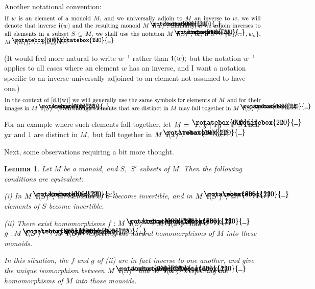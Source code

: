 \documentclass{amsart}
\newtheorem{lemma}[equation]{Lemma}
\numberwithin{equation}{section}
\newcommand{\I}{\mathbf{i}\hspace{.05em}}
\newcommand{\langl}{\begin{picture}(.51em,1em)
\put(.11em,.33em){\rotatebox{60}{\line(1,0){.55em}}}
\put(.11em,.33em){\rotatebox{300}{\line(1,0){.55em}}}
\end{picture}}
\newcommand{\rangl}{\begin{picture}(.5em,1em)
\put(.09em,.33em){\rotatebox{120}{\line(1,0){.55em}}}
\put(.09em,.33em){\rotatebox{240}{\line(1,0){.55em}}}
\end{picture}}
\begin{document}
Another notational convention:\vspace{.5em}
%
\begin{equation}\begin{minipage}[c]{35pc}\label{d.i(w)}
If $w$ is an element of a monoid $M,$ and we universally adjoin
to $M$ an inverse to $w,$ we will denote that inverse
$\I(w)$ and the resulting monoid $M\langl\I(w)\rangl.$
Similarly, if we adjoin inverses to all elements in
a subset $S\subseteq M,$ we shall use the notation
$M\langl\I(S)\rangl,$ or, if
$S=\{w_1,\dots,w_n\},$ $M\langl\I(w_1),\dots,\I(w_n)\rangl.$
\end{minipage}\end{equation}

(It would feel more natural to write $w^{-1}$ rather than $\I(w);$
but the notation $w^{-1}$ applies to all cases where an element $w$ has
an inverse, and I want a notation specific to an inverse universally
adjoined to an element not assumed to have one.)
%
\begin{equation}\begin{minipage}[c]{35pc}\label{d.same_symb}
In the context of~\eqref{d.i(w)} we will
generally use the same symbols for elements
of $M$ and for their images in $M\langl\I(S)\rangl$ (even
though elements that are distinct in $M$ may fall together
in $M\langl\I(S)\rangl).$
\end{minipage}\end{equation}

For an example where such elements fall together, let
$M= \langl x,\,y~|~xy=1\rangl.$
Then $yx$ and $1$ are distinct in $M,$ but fall together
in $M\langl\I(x)\rangl.$

Next, some observations requiring a bit more thought.

\begin{lemma}\label{L.S_&_S'}
Let $M$ be a monoid, and $S,$ $S'$ subsets of $M.$
Then the following conditions are equivalent:

{\rm(i)} In $M\langl\I(S)\rangl,$ all elements of $S'$ become
invertible, and
in $M\langl\I(S')\rangl,$ all elements of $S$ become invertible.

{\rm(ii)} There exist homomorphisms
$f: M\langl\I(S)\rangl\to M\langl\I(S')\rangl$
and $g: M\langl\I(S')\rangl\to M\langl\I(S)\rangl$
respecting the natural homomorphisms of $M$ into these monoids.

In this situation, the $f$ and $g$ of {\rm(ii)}
are in fact inverse to one another,
and give the unique isomorphism between
$M\langl\I(S)\rangl$ and $M\langl\I(S')\rangl$
respecting the homomorphisms of $M$ into those monoids.
\end{lemma}
\end{document}
